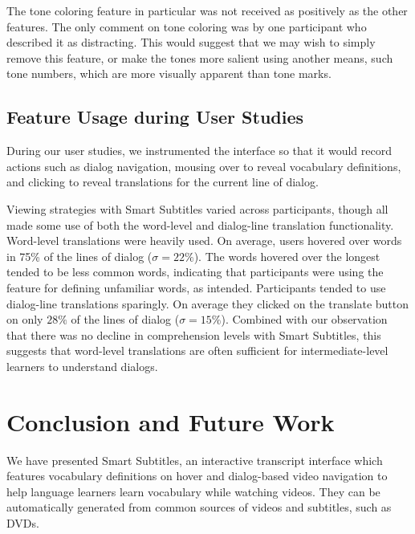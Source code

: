 \documentclass{sigchi}
\begin{document}
The tone coloring feature in particular was not received as positively as the other features. The only comment on tone coloring was by one participant who described it as distracting. This would suggest that we may wish to simply remove this feature, or make the tones more salient using another means, such tone numbers, which are more visually apparent than tone marks.
	 	 	

\subsection{Feature Usage during User Studies}

During our user studies, we instrumented the interface so that it would record actions such as dialog navigation, mousing over to reveal vocabulary definitions, and clicking to reveal translations for the current line of dialog.

Viewing strategies with Smart Subtitles varied across
participants, though all made some use of both
the word-level and dialog-line translation functionality.
Word-level translations were heavily used. On average,
users hovered over words in 75\% of the lines of dialog
($\sigma = 22\%$).
The words hovered over the longest tended to be less
common words, indicating that participants were using
the feature for defining unfamiliar words, as intended.
Participants tended to use dialog-line translations
sparingly. On average they clicked on the translate
button on only $28\%$ of the lines of dialog
($\sigma = 15\%$).
Combined with our observation that there was no decline in
comprehension levels with Smart Subtitles, this suggests
that word-level translations are often sufficient for
intermediate-level learners to understand dialogs.

\section{Conclusion and Future Work}

We have presented Smart Subtitles, an interactive
transcript interface which features vocabulary
definitions on hover and dialog-based video navigation
to help language learners learn vocabulary while watching videos.
They can be automatically generated from
common sources of videos and subtitles, such as DVDs.
\end{document}
